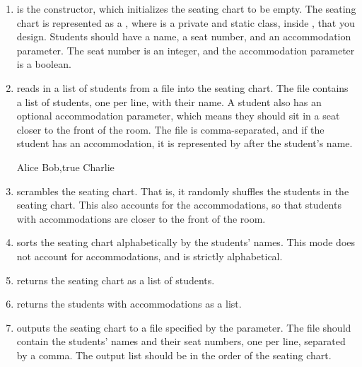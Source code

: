 \begin{enumerate}[label=(\alph*)]
    \item {} is the constructor, which initializes the seating chart to be empty. The seating chart is represented as a , where  is a private and static class, inside , that you design. Students should have a name, a seat number, and an accommodation parameter. The seat number is an integer, and the accommodation parameter is a boolean.

    \item {} reads in a list of students from a file into the seating chart. The file contains a list of students, one per line, with their name. A student also has an optional accommodation parameter, which means they should sit in a seat closer to the front of the room. The file is comma-separated, and if the student has an accommodation, it is represented by  after the student's name.
    \begin{verbnobox}[\small]
Alice
Bob,true
Charlie
    \end{verbnobox}
    \item {} scrambles the seating chart. That is, it randomly shuffles the students in the seating chart. This also accounts for the accommodations, so that students with accommodations are closer to the front of the room.
    \item {} sorts the seating chart alphabetically by the students' names. This mode does not account for accommodations, and is strictly alphabetical.
    \item {} returns the seating chart as a list of students.
    \item {} returns the students with accommodations as a list.
    \item {} outputs the seating chart to a file specified by the parameter. The file should contain the students' names and their seat numbers, one per line, separated by a comma. The output list should be in the order of the seating chart.
\end{enumerate}


